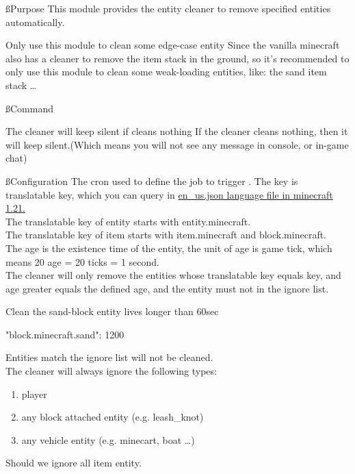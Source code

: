 
\ss{Purpose}
This module provides the entity cleaner to remove specified entities automatically.

\begin{note}{Only use this module to clean some edge-case entity}
    Since the vanilla minecraft also has a cleaner to remove the item stack in the ground, so it's recommended to only use this module to clean some weak-loading entities, like: the sand item stack \ldots
\end{note}


\ss{Command}
\begin{note}{The cleaner will keep silent if cleans nothing}
    If the cleaner cleans nothing, then it will keep silent.(Which means you will not see any message in console, or in-game chat)
\end{note}

\ss{Configuration}
The cron used to define the job to trigger .
The key is translatable key, which you can query in \href{https://github.com/sakurawald/fuji-fabric/blob/dev/.github/files/en_us.json}{en\_us.json language file in minecraft 1.21.} \\
The translatable key of entity starts with entity.minecraft. \\
The translatable key of item starts with item.minecraft and block.minecraft. \\
The age is the existence time of the entity, the unit of age is game tick, which means 20 age = 20 ticks = 1 second. \\
The cleaner will only remove the entities whose translatable key equals key, and age greater equals the defined age, and the entity must not in the ignore list.

\begin{example}{Clean the sand-block entity lives longer than 60sec}
    \begin{json}
            "block.minecraft.sand": 1200
    \end{json}
\end{example}

Entities match the ignore list will not be cleaned. \\
The cleaner will always ignore the following types:
\begin{enumerate}
    \item player
    \item any block attached entity (e.g. leash\_knot)
    \item any vehicle entity (e.g. minecart, boat \ldots)
\end{enumerate}
Should we ignore all item entity.

